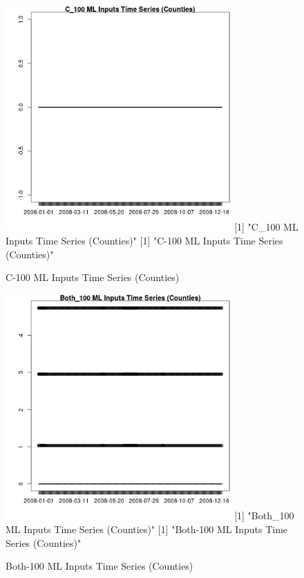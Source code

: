 \begin{figure} 
\centering  
\includegraphics[width=0.77\textwidth]{Code_Outputs/ML_input_report_ML_input_CountyGeometricCentroids_Locations_Dates_part_c_2008-01-01to2008-12-31_C_100TS.jpg} 
[1] "C_100 ML Inputs Time Series (Counties)"
[1] "C-100 ML Inputs Time Series (Counties)"
\caption{\label{fig:ML_input_report_ML_input_CountyGeometricCentroids_Locations_Dates_part_c_2008-01-01to2008-12-31C_100TS}C-100 ML Inputs Time Series (Counties)} 
\end{figure} 
 

\begin{figure} 
\centering  
\includegraphics[width=0.77\textwidth]{Code_Outputs/ML_input_report_ML_input_CountyGeometricCentroids_Locations_Dates_part_c_2008-01-01to2008-12-31_Both_100TS.jpg} 
[1] "Both_100 ML Inputs Time Series (Counties)"
[1] "Both-100 ML Inputs Time Series (Counties)"
\caption{\label{fig:ML_input_report_ML_input_CountyGeometricCentroids_Locations_Dates_part_c_2008-01-01to2008-12-31Both_100TS}Both-100 ML Inputs Time Series (Counties)} 
\end{figure} 
 


